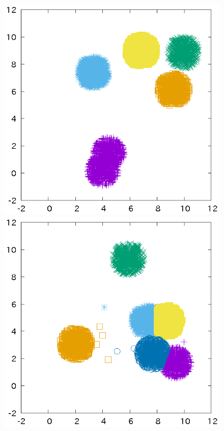 ﻿\documentclass{jsarticle}
\begin{document}
\begin{figure}[h]
\begin{center}
 \begin{minipage}{.32\textwidth}
 \begin{center}
 \includegraphics[height=.18\textheight]{fig/k2.eps}
 \end{center}
 \end{minipage}
 \begin{minipage}{.32\textwidth}
 \begin{center}
 \includegraphics[height=.18\textheight]{fig/k1.eps}

\end{center}
\end{minipage}
\end{center}
\end{figure}
\end{document}
